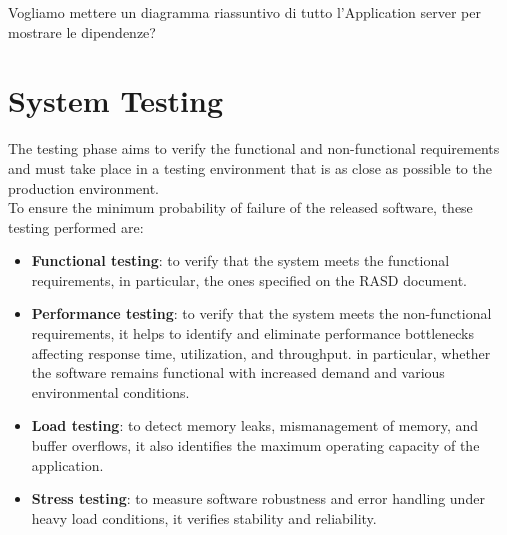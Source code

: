 {\color{red} Vogliamo mettere un diagramma riassuntivo di tutto l'Application server per mostrare le dipendenze?}

\section{System Testing}
The testing phase aims to verify the functional and non-functional requirements and must take place in a testing environment that is as close as possible to the production environment.\\
To ensure the minimum probability of failure of the released software, these testing performed are:
\begin{itemize}
    \item \textbf{Functional testing}: to verify that the system meets the functional requirements, in particular, the ones specified on the RASD document.
    \item \textbf{Performance testing}: to verify that the system meets the non-functional requirements, it helps to identify and eliminate performance bottlenecks affecting response time, utilization, and throughput. in particular, whether the software remains functional with increased demand and various environmental conditions.
    \item \textbf{Load testing}: to detect memory leaks, mismanagement of memory, and buffer overflows, it also identifies the maximum operating capacity of the application.
    \item \textbf{Stress testing}: to measure software robustness and error handling under heavy load conditions, it verifies stability and reliability.
\end{itemize}
